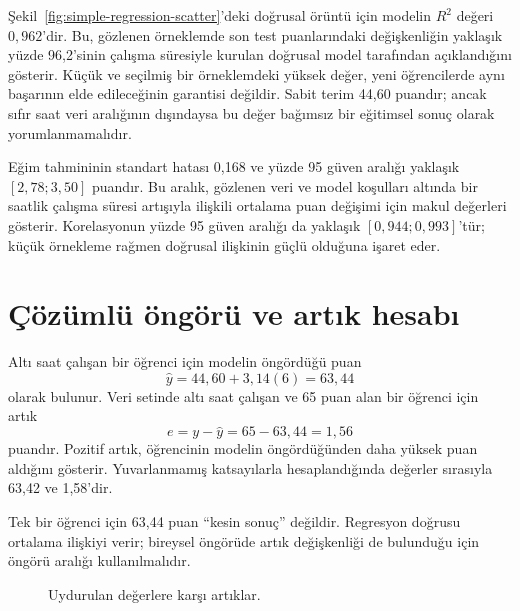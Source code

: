 Şekil~\ref{fig:simple-regression-scatter}'deki doğrusal örüntü için modelin
$R^2$ değeri $0{,}962$'dir. Bu, gözlenen örneklemde son test
puanlarındaki değişkenliğin yaklaşık yüzde 96,2'sinin çalışma süresiyle
kurulan doğrusal model tarafından açıklandığını gösterir. Küçük ve seçilmiş
bir örneklemdeki yüksek değer, yeni öğrencilerde aynı başarının elde
edileceğinin garantisi değildir. Sabit terim 44,60 puandır; ancak sıfır saat
veri aralığının dışındaysa bu değer bağımsız bir eğitimsel sonuç olarak
yorumlanmamalıdır.

Eğim tahmininin standart hatası 0,168 ve yüzde 95 güven aralığı yaklaşık
$[2{,}78;3{,}50]$ puandır. Bu aralık, gözlenen veri ve model koşulları altında
bir saatlik çalışma süresi artışıyla ilişkili ortalama puan değişimi için
makul değerleri gösterir. Korelasyonun yüzde 95 güven aralığı da yaklaşık
$[0{,}944;0{,}993]$'tür; küçük örnekleme rağmen doğrusal ilişkinin güçlü
olduğuna işaret eder.

\section{Çözümlü öngörü ve artık hesabı}

Altı saat çalışan bir öğrenci için modelin öngördüğü puan
\[
\hat y=44{,}60+3{,}14(6)=63{,}44
\]
olarak bulunur. Veri setinde altı saat çalışan ve 65 puan alan bir öğrenci
için artık
\[
e=y-\hat y=65-63{,}44=1{,}56
\]
puandır. Pozitif artık, öğrencinin modelin öngördüğünden daha yüksek puan
aldığını gösterir. Yuvarlanmamış katsayılarla hesaplandığında değerler
sırasıyla 63,42 ve 1,58'dir.

Tek bir öğrenci için 63,44 puan ``kesin sonuç'' değildir. Regresyon doğrusu
ortalama ilişkiyi verir; bireysel öngörüde artık değişkenliği de bulunduğu
için öngörü aralığı kullanılmalıdır.

\begin{figure}[H]
\centering
{}
\caption{Uydurulan değerlere karşı artıklar.}
\label{fig:simple-regression-residuals}
\end{figure}

